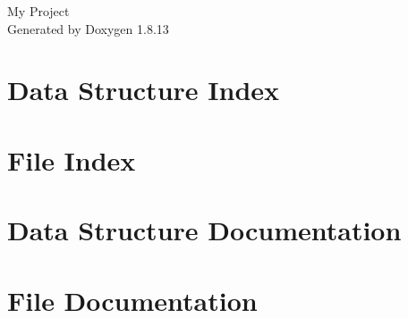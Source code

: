 \documentclass[twoside]{book}
\newcommand{\+}{\discretionary{\mbox{\scriptsize$\hookleftarrow$}}{}{}}
\newcommand{\clearemptydoublepage}{%
  \newpage{\pagestyle{empty}\cleardoublepage}%
}
\begin{document}
\hypersetup{pageanchor=false,
             bookmarksnumbered=true,
             pdfencoding=unicode
            }
\begin{titlepage}
\vspace*{7cm}
\begin{center}%
{\Large My Project }\\
\vspace*{1cm}
{\large Generated by Doxygen 1.8.13}\\
\end{center}
\end{titlepage}
\clearemptydoublepage
{}
\tableofcontents
\clearemptydoublepage
{}
\hypersetup{pageanchor=true}

\chapter{Data Structure Index}

\chapter{File Index}

\chapter{Data Structure Documentation}



\chapter{File Documentation}










\backmatter
\newpage
{}
\clearemptydoublepage
{}
\printindex
\end{document}
